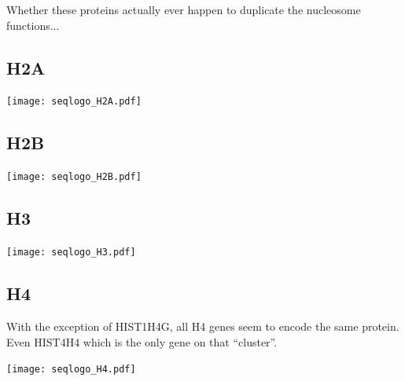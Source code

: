 \documentclass[10pt,a4paper,twocolumn,article]{memoir}
\begin{document}
      Whether these proteins actually ever happen to duplicate the nucleosome functions...


    \subsection{H2A}
      \begin{TableAndFigure*}
        \label{tab:H2A-consensus}
        

        \texttt{[image: seqlogo\_H2A.pdf]}
        \label{fig:H2A-weblogo}
      \end{TableAndFigure*}


    \subsection{H2B}
      \begin{TableAndFigure*}
        \label{tab:H2B-consensus}
        

        \texttt{[image: seqlogo\_H2B.pdf]}
        \label{fig:H2B-weblogo}
      \end{TableAndFigure*}

    \subsection{H3}
      \begin{TableAndFigure*}
        \label{tab:H3-consensus}
        

        \texttt{[image: seqlogo\_H3.pdf]}
        \label{fig:H3-weblogo}
      \end{TableAndFigure*}

    \subsection{H4}
      With the exception of HIST1H4G, all H4 genes seem to encode the same protein. Even HIST4H4 which is the
      only gene on that ``cluster''.
      \begin{TableAndFigure*}
        \label{tab:H4-consensus}
        

        \texttt{[image: seqlogo\_H4.pdf]}
        \label{fig:H4-weblogo}
      \end{TableAndFigure*}
\end{document}
